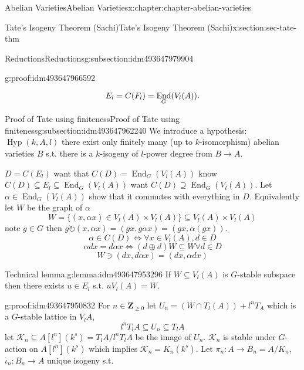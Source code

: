 \documentclass[oneside,10pt,]{book}
\newcommand{\qedhere}{\relax}
\numberwithin{equation}{section}
\newcommand{\lb}{[}
\newcommand{\rb}{]}
\newcommand{\ZZ}{\mathbf{Z}}
\newcommand{\acts}{\circlearrowright}
\DeclareMathOperator{\End}{End}
\begin{document}
\begin{chapterptx}{Abelian Varieties}{}{Abelian Varieties}{}{}{x:chapter:chapter-abelian-varieties}
\begin{sectionptx}{Tate's Isogeny Theorem (Sachi)}{}{Tate's Isogeny Theorem (Sachi)}{}{}{x:section:sec-tate-thm}
\begin{subsectionptx}{Reductions}{}{Reductions}{}{}{g:subsection:idm493647979904}
\begin{proofptx}{}{g:proof:idm493647966592}
\begin{enumerate}
\begin{equation*}
E_l = C(F_l) = \End_G(V_l(A))\text{.}\qedhere
\end{equation*}
%
\end{enumerate}
%
\end{proofptx}
\end{subsectionptx}
%
%
\typeout{************************************************}
\typeout{************************************************}
%
\begin{subsectionptx}{Proof of Tate using finiteness}{}{Proof of Tate using finiteness}{}{}{g:subsection:idm493647962240}
We introduce a hypothesis: \(\operatorname{Hyp}(k,A,l)\) there exist only finitely many (up to \(k\)-isomorphism) abelian varieties \(B\) s.t. there is a \(k\)-isogeny of \(l\)-power degree from \(B\to A\).%
\par
\(D =C(E_l)\) want that \(C(D) = \End_G(V_l(A))\) know \(C(D) \subseteq E_l \subseteq \End_G(V_l(A))\) want \(C(D) \supseteq \End_G(V_l(A))\). Let \(\alpha \in \End_G(V_l(A))\) show that it commutes with everything in \(D\). Equivalently let \(W\) be the graph of \(\alpha\)%
\begin{equation*}
W = \{(x,\alpha x) \in V_l(A)\times V_l(A)\} \subseteq V_l(A)\times V_l(A)
\end{equation*}
note \(g\in G\) then \(g\acts (x,\alpha x) = (gx,g\alpha x ) = (gx, \alpha(gx))\).%
\begin{equation*}
\alpha\in C(D) \iff \forall x\in V_l(A), d\in D
\end{equation*}
%
\begin{equation*}
\alpha d x = d\alpha x \iff (d\oplus d)W \subseteq W \forall d\in D
\end{equation*}
%
\begin{equation*}
W\ni (dx, d\alpha x) = (dx, \alpha d x)
\end{equation*}
%
\begin{lemma}{Technical lemma.}{}{g:lemma:idm493647953296}%
If \(W\subseteq V_l(A)\) is \(G\)-stable subspace then there exists \(u\in E_l\) s.t. \(u V_l(A) = W\).%
\end{lemma}
\begin{proofptx}{}{g:proof:idm493647950832}
For \(n \in \ZZ_{\ge 0}\) let \(U_n = (W\cap T_l(A)) + l^n T_A\) which is a \(G\)-stable lattice in \(V_l A\),%
\begin{equation*}
l^nT_lA \subseteq U_n \subseteq T_l A
\end{equation*}
let \(\mathcal K_n \subseteq A\lb l^n \rb (k^s) = T_l A/ l^n T_l A\) be the image of \(U_n\). \(\mathcal K_n\) is stable under \(G\)-action on \(A\lb l^n \rb (k^s)\) which implies \(\mathcal K_n = K_n (k^s)\). Let \(\pi_n \colon A \to B_n = A/ K_n\), \(\iota_n \colon B_n \to A\) unique isogeny s.t.%

\end{proofptx}
\end{subsectionptx}
\end{sectionptx}
\end{chapterptx}
\end{document}
